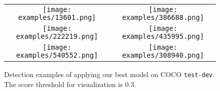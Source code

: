 \vspace{-2mm}

\begin{figure*}[tbp]
	\centering
	\begin{tabular}{cc}
		\texttt{[image: examples/13601.png]}&
		\texttt{[image: examples/386688.png]}\\
		\texttt{[image: examples/222219.png]}&
		\texttt{[image: examples/435995.png]}\\
		\texttt{[image: examples/540552.png]}&
		\texttt{[image: examples/308940.png]}\\
	\end{tabular}
	\caption{Detection examples of applying our best model on COCO \texttt{test-dev}. The score threshold for visualization is 0.3.
	}\vspace{-2mm}
	\label{fig:example}
\end{figure*}








    
